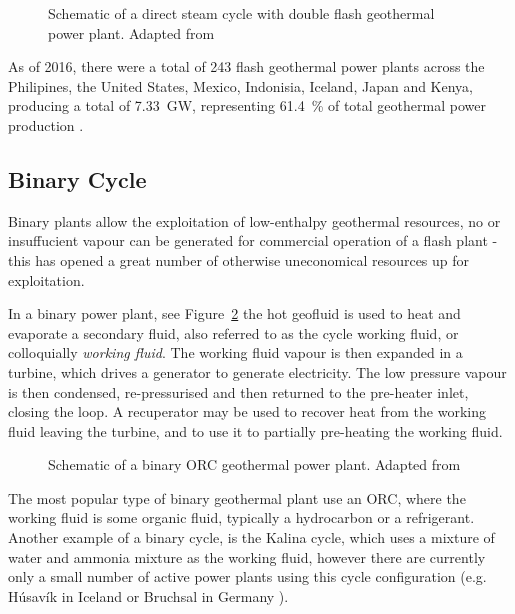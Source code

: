         \begin{figure}[H]
            \centering
            
            \caption[Schematic of a direct steam cycle with double flash geothermal power plant.]{Schematic of a direct steam cycle with double flash geothermal power plant. Adapted from \cite{DiPippo2016}}
            \label{fig:schematic_dual_flash}
        \end{figure}

        As of 2016, there were a total of \num{243} flash geothermal power plants across the Philipines, the United States, Mexico, Indonisia, Iceland, Japan and Kenya, producing a total of \qty{7.33}{\giga\watt}, representing \qty{61.4}{\percent} of total geothermal power production \cite{DiPippo2016}.

    \subsection{Binary Cycle}
    \label{sec:binary_cycle}

        Binary plants allow the exploitation of low-enthalpy geothermal resources, no or insuffucient vapour can be generated for commercial operation of a flash plant - this has opened a great number of otherwise uneconomical resources up for exploitation.

        In a binary power plant, see Figure~\ref{fig:schematic_binary} the hot geofluid is used to heat and evaporate a secondary fluid, also referred to as the cycle working fluid, or colloquially \emph{working fluid}. The working fluid vapour is then expanded in a turbine, which drives a generator to generate electricity. The low pressure vapour is then condensed, re-pressurised and then returned to the pre-heater inlet, closing the loop. A recuperator may be used to recover heat from the working fluid leaving the turbine, and to use it to partially pre-heating the working fluid.

        \begin{figure}[H]
            \centering
            
            \caption[Schematic of a binary ORC geothermal power plant.]{Schematic of a binary ORC geothermal power plant. Adapted from \cite{DiPippo2016}}
            \label{fig:schematic_binary}
        \end{figure}

        The most popular type of binary geothermal plant use an \ac{ORC}, where the working fluid is some organic fluid, typically a hydrocarbon or a refrigerant. Another example of a binary cycle, is the Kalina cycle, which uses a mixture of water and ammonia mixture as the working fluid, however there are currently only a small number of active power plants using this cycle configuration (e.g. Húsavík in Iceland \cite{Husavik2024} or Bruchsal in Germany \cite{EnBW2024}).

